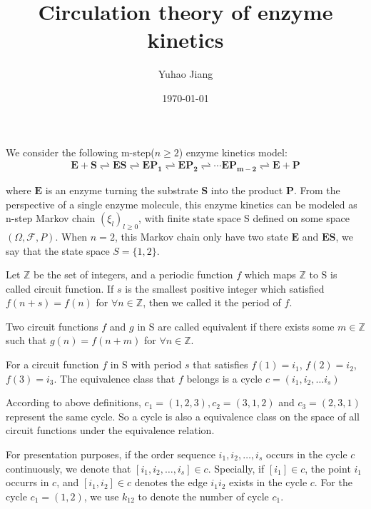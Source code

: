 \documentclass[11pt,en,cite=authoryear]{elegantpaper}
\title{Circulation theory of enzyme kinetics}
\author{Yuhao Jiang}
\date{\today}
\begin{document}
\maketitle
We consider the following m-step($n\ge 2$) enzyme kinetics model:
\begin{align} \label{eq:model}
    \bm{E + S \rightleftharpoons
    ES \rightleftharpoons
    EP_1 \rightleftharpoons
    EP_2 \rightleftharpoons
    \cdots
    EP_{m-2} \rightleftharpoons
    E + P}
\end{align}

where $\bm{E}$ is an enzyme turning the substrate $\bm{S}$ into the product $\bm{P}$. From the  perspective of a single enzyme molecule, this enzyme kinetics can be modeled as n-step Markov chain $(\xi_l)_{l\ge 0}$, with finite state space S defined on some space $(\Omega, \mathcal{F}, P)$. When $n=2$, this Markov chain only have two state $\bm{E}$ and $\bm{ES}$, we say that the state space $S=\{1, 2\}$.

\begin{definition}
    Let $\mathbb{Z}$ be the set of integers, and a periodic function $f$ which maps $\mathbb{Z}$ to S is called circuit function. If $s$ is the smallest positive integer which satisfied $f(n+s) = f(n)$ for $\forall n \in \mathbb{Z}$, then we called it the period of $f$.
\end{definition}

\begin{definition}
    Two circuit functions $f$ and $g$ in S are called equivalent if there exists some $m \in \mathbb{Z}$ such that $g(n) = f(n+m)$ for $\forall n \in \mathbb{Z}$.
\end{definition}
\begin{definition}
    For a circuit function $f$ in S with period $s$ that satisfies $f(1)=i_1$, $f(2)=i_2$, $f(3)=i_3$. The equivalence class that $f$ belongs is a cycle $c=(i_1, i_2, \dots i_s)$
\end{definition}

According to above definitions, $c_1 = (1, 2, 3), c_2 = (3, 1, 2)$ and $c_3 = (2, 3, 1)$ represent the same cycle. So a cycle is also a equivalence class on the space of all circuit functions under the equivalence relation.

For presentation purposes, if the order sequence $i_1, i_2, \dots, i_s$ occurs in the cycle $c$ continuously, we denote that $[i_1, i_2, \dots, i_s] \in c$. Specially, if $[i_1] \in c$, the point $i_1$ occurrs in $c$, and $[i_1, i_2] \in c$ denotes the edge $i_1 i_2$ exists in the cycle $c$. 
For the cycle $c_1 = (1,2)$, we use $k_{12}$ to denote the number of cycle $c_1$.
\end{document}
